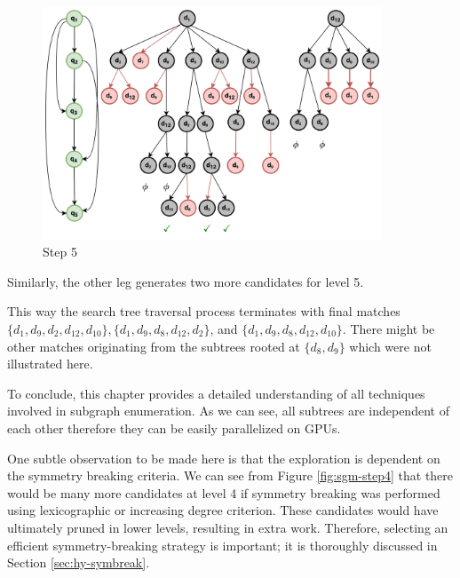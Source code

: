 \begin{enumerate}[Step 1:]
\begin{figure}
              \includegraphics[width=0.9\textwidth]{fig/LR/sgm-step5.png}
              \caption{Step 5}
              \label{fig:sgm-step5}
          \end{figure}
          Similarly, the other leg generates two more candidates for level 5.
\end{enumerate}
This way the search tree traversal process terminates with final matches
$\{d_1, d_9, d_2, d_{12}, d_{10} \}, \{d_1, d_9, d_8, d_{12}, d_2\}$, and $\{d_1, d_9, d_8, d_{12}, d_{10}\}$.
There might be other matches originating from the subtrees rooted at $\{d_8, d_9\}$ which were not illustrated here.

To conclude, this chapter provides a detailed understanding of all techniques involved in subgraph enumeration. As we can see, all subtrees are independent of each other therefore they can be easily parallelized on GPUs.

One subtle observation to be made here is that the exploration is dependent on the symmetry breaking criteria.
We can see from Figure \ref{fig:sgm-step4} that there would be many more candidates at level 4 if symmetry breaking was performed using lexicographic or increasing degree criterion.
These candidates would have ultimately pruned in lower levels, resulting in extra work.
Therefore, selecting an efficient symmetry-breaking strategy is important; it is thoroughly discussed in Section \ref{sec:hy-symbreak}.
